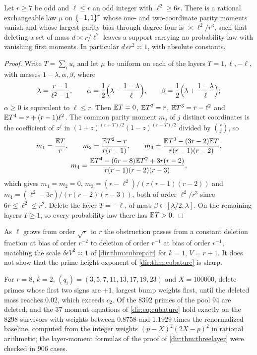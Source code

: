 \begin{theorem}\label{dir:thm:threelayer}
Let $r\ge7$ be odd and $\ell\le r$ an odd integer with $\ell^2\ge6r$. There is a rational exchangeable law $\mu$
on $\{-1,1\}^r$ whose one- and two-coordinate parity moments vanish and whose largest parity bias through
degree four is $\asymp\ell^2/r^3$, such that deleting a set of mass $d\asymp r/\ell^2$ leaves a support carrying
no probability law with vanishing first moments. In particular $d\,\epsilon r^2\asymp1$, with absolute
constants.
\end{theorem}

\begin{proof}
Write $T=\sum_iu_i$ and let $\mu$ be uniform on each of the layers $T=1,\ell,-\ell$, with masses
$1-\lambda,\alpha,\beta$, where
\[
 \lambda=\frac{r-1}{\ell^2-1},\qquad\alpha=\frac12\Bigl(\lambda-\frac{1-\lambda}\ell\Bigr),\qquad
 \beta=\frac12\Bigl(\lambda+\frac{1-\lambda}\ell\Bigr);
\]
$\alpha\ge0$ is equivalent to $\ell\le r$. Then $\mathbb{E} T=0$, $\mathbb{E} T^2=r$, $\mathbb{E} T^3=r-\ell^2$ and
$\mathbb{E} T^4=r+(r-1)\ell^2$. The common parity moment $m_j$ of $j$ distinct coordinates is the coefficient of $z^j$
in $(1+z)^{(r+T)/2}(1-z)^{(r-T)/2}$ divided by $\binom rj$, so
\begin{gather*}
 m_1=\frac{\mathbb{E} T}r,\qquad m_2=\frac{\mathbb{E} T^2-r}{r(r-1)},\qquad m_3=\frac{\mathbb{E} T^3-(3r-2)\mathbb{E} T}{r(r-1)(r-2)},\\
 m_4=\frac{\mathbb{E} T^4-(6r-8)\mathbb{E} T^2+3r(r-2)}{r(r-1)(r-2)(r-3)},
\end{gather*}
which gives $m_1=m_2=0$, $m_3=(r-\ell^2)/(r(r-1)(r-2))$ and $m_4=(\ell^2-3r)/(r(r-2)(r-3))$, both of order
$\ell^2/r^3$ since $6r\le\ell^2\le r^2$. Delete the layer $T=-\ell$, of mass $\beta\in[\lambda/2,\lambda]$. On the
remaining layers $T\ge1$, so every probability law there has $\mathbb{E} T>0$.
\end{proof}

As $\ell$ grows from order $\sqrt r$ to $r$ the obstruction passes from a constant deletion fraction at bias of
order $r^{-2}$ to deletion of order $r^{-1}$ at bias of order $r^{-1}$, matching the scale
$\delta\epsilon V^2\asymp1$ of \cref{dir:thm:cubrepair} for $k=1$, $V=r+1$. It does not show that the
prime-height exponent of \cref{dir:thm:cubature} is sharp.

\begin{example}\label{dir:ex:cubature}
For $r=8$, $k=2$, $(q_i)=(3,5,7,11,13,17,19,23)$ and $X=100000$, delete primes whose first two signs are $+1$,
largest bump weights first, until the deleted mass reaches $0.02$, which exceeds $c_2$. Of the $8392$ primes of
the pool $94$ are deleted, and the $37$ moment equations of \eqref{dir:eq:cubature} hold exactly on the $8298$
survivors with weights between $0.8758$ and $1.1929$ times the renormalized baseline, computed from the
integer weights $(p-X)^2(2X-p)^2$ in rational arithmetic; the layer-moment formulas of the proof of
\cref{dir:thm:threelayer} were checked in $906$ cases.
\end{example}

